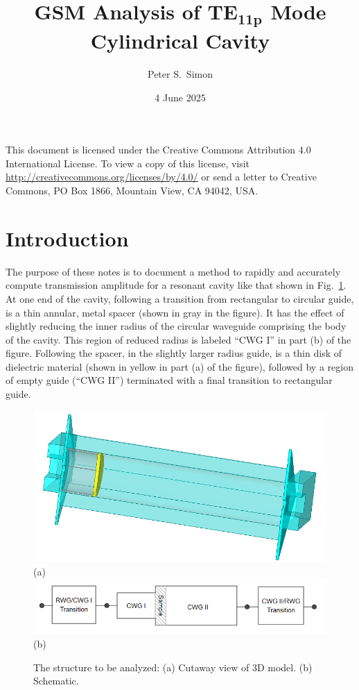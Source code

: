 \documentclass[11pt]{article}
\newcommand{\fref}[1]{Fig.~\ref{#1}}
\begin{document}
\title{\bfseries GSM Analysis of TE$_{\boldsymbol{1}\boldsymbol{1}\boldsymbol{p}}$ Mode Cylindrical Cavity}
\author{Peter S.\ Simon}        
\date{4 June 2025}
\maketitle
This document is licensed under the Creative Commons Attribution 4.0 International License.
To view a copy of this license, visit \url{http://creativecommons.org/licenses/by/4.0/}
or send a letter to Creative Commons, PO Box 1866, Mountain View, CA 94042, USA. 




\section{Introduction}
\label{sec:intro}
The purpose of these notes is to document a method to rapidly and accurately compute transmission amplitude for
a resonant cavity like that shown in \fref{fig:structure}.  At one end of the cavity, following
a transition from rectangular to circular guide, is a thin annular, metal
spacer (shown in gray in the figure). It has the effect of slightly reducing the inner radius of the circular
waveguide comprising the body of the cavity. This region of reduced radius is labeled ``CWG I'' in part (b)
of the figure. Following the spacer, in the slightly larger radius guide,
is a thin disk of dielectric material (shown in yellow in part (a) of the figure),
followed by a region of empty guide (``CWG II'') terminated with a final transition to rectangular guide.
%
\begin{figure}
  \centering
  \includegraphics[scale=0.4]{CAD_image.png} \\ (a)
  \\[\baselineskip]
  \includegraphics[scale=0.6]{schematic_diagram.png} \\ (b)
  \caption{The structure to be analyzed: (a) Cutaway view of 3D model. (b) Schematic.}
    \label{fig:structure}
\end{figure}
\end{document}
